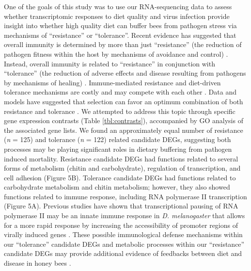 \documentclass{bmcart}
\begin{document}
\begin{linenumbers}
\begin{doublespacing}
One of the goals of this study was to use our RNA-sequencing data to assess whether transcriptomic responses to diet quality and virus infection provide insight into whether high quality diet can buffer bees from pathogen stress via mechanisms of ``resistance'' or ``tolerance''. Recent evidence has suggested that overall immunity is determined by more than just ``resistance'' (the reduction of pathogen fitness within the host by mechanisms of avoidance and control) \cite{resTol2}. Instead, overall immunity is related to ``resistance'' in conjunction with ``tolerance'' (the reduction of adverse effects and disease resulting from pathogens by mechanisms of healing) \cite{resTol1, resTol2}. Immune-mediated resistance and diet-driven tolerance mechanisms are costly and may compete with each other \cite{resTol1, resTol4}. Data and models have suggested that selection can favor an optimum combination of both resistance and tolerance \cite{resTol5, resTol6, resTol7, resTol8}. We attempted to address this topic through specific gene expression contrasts (Table \ref{tbl:contrasts}), accompanied by GO analysis of the associated gene lists. We found an approximately equal number of resistance (\textit{n} = 125) and tolerance (\textit{n} = 122) related candidate DEGs, suggesting both processes may be playing significant roles in dietary buffering from pathogen induced mortality. Resistance candidate DEGs had functions related to several forms of metabolism (chitin and carbohydrate), regulation of transcription, and cell adhesion (Figure 5B). Tolerance candidate DEGs had functions related to carbohydrate metabolism and chitin metabolism; however, they also showed functions related to immune response, including RNA polymerase II transcription (Figure 5A). Previous studies have shown that transcriptional pausing of RNA polymerase II may be an innate immune response in \textit{D. melanogaster} that allows for a more rapid response by increasing the accessibility of promoter regions of virally induced genes \cite{resTol11}. These possible immunological defense mechanisms within our ``tolerance'' candidate DEGs and metabolic processes within our ``resistance'' candidate DEGs may provide additional evidence of feedbacks between diet and disease in honey bees \cite{AdamTothReview}.


\end{doublespacing}
\end{linenumbers}
\end{document}
